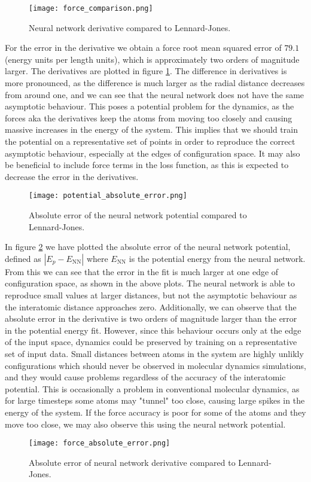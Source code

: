 \begin{figure}[H]
    \centering
    \texttt{[image: force\_comparison.png]}
    \caption{Neural network derivative compared to Lennard-Jones.}
    \label{fig:force-comparison}
\end{figure}

For the error in the derivative we obtain a force root mean squared error
of $79.1$ (energy units per length units), which is approximately two orders
of magnitude larger. The derivatives are plotted in figure
\ref{fig:force-comparison}.
The difference in derivatives is more pronounced, as the
difference is much larger as the radial distance decreases from
around one, and we can see that the neural network does not
have the same asymptotic behaviour. This poses a potential problem
for the dynamics, as the forces aka the derivatives keep
the atoms from moving too closely and causing massive
increases in the energy of the system.
This implies that we should train the potential on a representative
set of points in order to reproduce the correct asymptotic behaviour,
especially at the edges of configuration space.
It may also be beneficial to include force terms in the loss function,
as this is expected to decrease the error in the derivatives.

\begin{figure}[H]
    \centering
    \texttt{[image: potential\_absolute\_error.png]}
    \caption{Absolute error of the neural network potential compared
        to Lennard-Jones.}
    \label{fig:potential-rel-error}
\end{figure}

In figure \ref{fig:potential-rel-error} we have plotted
the absolute error of the neural network potential, defined
as $\left| E_p - E_{\text{NN}}\right|$
where $E_{\text{NN}}$ is the potential energy from the neural network.
From this we can see that the error in the fit is much larger
at one edge of configuration space, as shown in the above plots.
The neural network is able to reproduce small values
at larger distances, but not the asymptotic behaviour
as the interatomic distance approaches zero.
Additionally, we can observe that the absolute error in the derivative
is two orders of magnitude larger than the error in the potential energy fit.
However, since
this behaviour occurs only at the edge of the input space,
dynamics could be preserved by training on a representative set
of input data. Small distances between atoms in the system are highly
unlikly configurations which
should never be observed in molecular dynamics simulations,
and they would cause problems regardless of the accuracy of the
interatomic potential. This is occasionally a problem in conventional
molecular dynamics, as for large timesteps some atoms may "tunnel"
too close, causing large spikes in the energy of the system.
If the force accuracy is poor for some of the atoms and they move too close,
we may also observe this using the neural network potential.

\begin{figure}[htb]
    \centering
    \texttt{[image: force\_absolute\_error.png]}
    \caption{Absolute error of neural network derivative compared
        to Lennard-Jones.}
    \label{fig:force-rel-error}
\end{figure}

